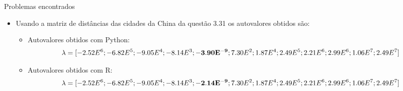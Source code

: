 \documentclass{beamer}
\begin{document}
\begin{frame}{Problemas encontrados}
  \begin{itemize}
  \item Usando a matriz de dist\^ancias das cidades da China da quest\~{a}o 3.31 os autovalores obtidos s\~{a}o:
    \begin{itemize}
    \item Autovalores obtidos com Python: 
      \begin{equation*}
        \lambda = [-2.52E^6; -6.82E^5; -9.05E^4; -8.14E^3; \mathbf{-3.90E^{-9}}; 7.30E^2; \\ \newline
        1.87E^4; 2.49E^5; 2.21E^6; 2.99E^6; 1.06E^7; 2.49E^7]
      \end{equation*}
    \item Autovalores obtidos com R:
      \begin{equation*}
        \lambda = [-2.52E^6; -6.82E^5; -9.05E^4; -8.14E^3; \mathbf{-2.14E^{-9}}; 7.30E^2; \\ \newline
        1.87E^4; 2.49E^5; 2.21E^6; 2.99E^6; 1.06E^7; 2.49E^7]
      \end{equation*}
    \end{itemize}
  \end{itemize}
\end{frame}
\end{document}
